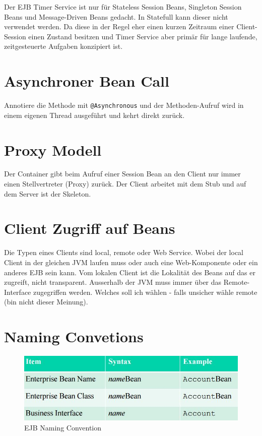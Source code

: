 Der EJB Timer Service ist nur für Stateless Session Beans, Singleton Session Beans und Message-Driven Beans gedacht. In Statefull kann dieser nicht verwendet werden. Da diese in der Regel eher einen kurzen Zeitraum einer Client-Session einen Zustand besitzen und Timer Service aber primär für lange laufende, zeitgesteuerte Aufgaben konzipiert ist.

\section{Asynchroner Bean Call}
Annotiere die Methode mit \verb|@Asynchronous| und der Methoden-Aufruf wird in einem eigenen Thread ausgeführt und kehrt direkt zurück.

\section{Proxy Modell}
Der Container gibt beim Aufruf einer Session Bean an den Client nur immer einen Stellvertreter (Proxy) zurück. Der Client arbeitet mit dem Stub und auf dem Server ist der Skeleton.

\section{Client Zugriff auf Beans}
Die Typen eines Clients sind local, remote oder Web Service. Wobei der local Client in der gleichen JVM laufen muss oder auch eine Web-Komponente oder ein anderes EJB sein kann. Vom lokalen Client ist die Lokalität des Beans auf das er zugreift, nicht transparent. Ausserhalb der JVM muss immer über das Remote-Interface zugegriffen werden. Welches soll ich wählen - falls unsicher wähle remote (bin nicht dieser Meinung).

\newpage
\section{Naming Convetions}
\begin{figure}[h!]
\centering
\includegraphics[width=0.7\linewidth]{fig/ejb-naming-convention}
\caption{EJB Naming Convention}
\label{fig:ejb-naming-convention}
\end{figure}

